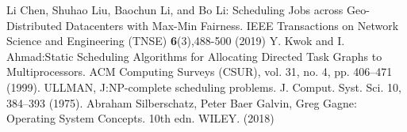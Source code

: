 
%
%
%
% 
% 
%
\begin{thebibliography}{8}
Li Chen, Shuhao Liu, Baochun Li, and Bo Li: Scheduling Jobs across Geo-Distributed Datacenters with Max-Min Fairness. IEEE Transactions on Network Science and Engineering (TNSE) \textbf{6}(3),488-500 (2019)
Y. Kwok and I. Ahmad:Static Scheduling Algorithms for Allocating
Directed Task Graphs to Multiprocessors. ACM Computing Surveys
(CSUR), vol. 31, no. 4, pp. 406–471 (1999).
ULLMAN, J:NP-complete scheduling
problems. J. Comput. Syst. Sci. 10, 384–393 (1975).
Abraham Silberschatz, Peter Baer Galvin, Greg Gagne: Operating System Concepts. 10th edn. WILEY.
 (2018)




\end{thebibliography}